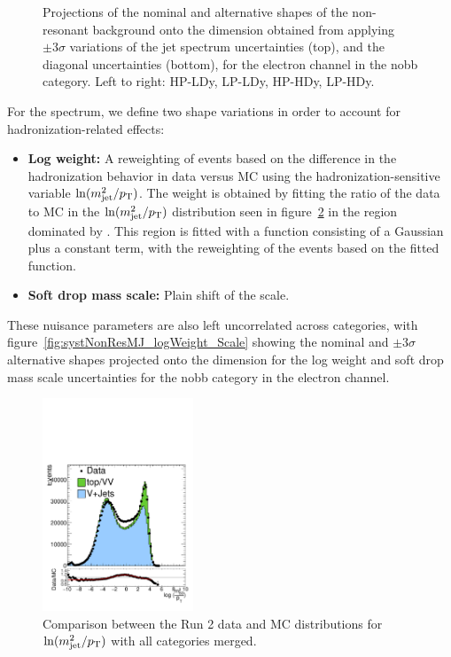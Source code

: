 \begin{figure}[htbp]
  \caption{
    Projections of the nominal and alternative shapes of the non-resonant background onto the \MVV dimension obtained from applying $\pm3\sigma$ variations of the jet \pt spectrum uncertainties (top), and the diagonal uncertainties (bottom), for the electron channel in the nobb category.
    Left to right: HP-LDy, LP-LDy, HP-HDy, LP-HDy.
  }
  \label{fig:systNonResMVV_MVVScale_Diag}
\end{figure}

For the \MJ spectrum, we define two shape variations in order to account for hadronization-related effects:
\begin{itemize}
  \item {\bfseries Log weight:} A reweighting of events based on the difference in the hadronization behavior in data versus MC using the hadronization-sensitive variable $\ln(m_\mathrm{jet}^2/p_\mathrm{T})$.
  The weight is obtained by fitting the ratio of the data to MC in the $\ln(m_\mathrm{jet}^2/p_\mathrm{T})$ distribution seen in figure~\ref{fig:logWeight} in the region dominated by \Wjets.
  This region is fitted with a function consisting of a Gaussian plus a constant term, with the reweighting of the events based on the fitted function.
  \item {\bfseries Soft drop mass scale:} Plain shift of the \MJ scale.
\end{itemize}
These nuisance parameters are also left uncorrelated across categories, with figure~\ref{fig:systNonResMJ_logWeight_Scale} showing the nominal and $\pm3\sigma$ alternative shapes projected onto the \MJ dimension for the log weight and soft drop mass scale uncertainties for the nobb category in the electron channel.

\begin{figure}[htbp]
  \centering
  \includegraphics[width=0.4\textwidth]{fig/uncertainties/logWeight.pdf}
  \caption{
    Comparison between the Run 2 data and MC distributions for $\ln(m_\mathrm{jet}^2/p_\mathrm{T})$ with all categories merged.
  }
  \label{fig:logWeight}
\end{figure}

